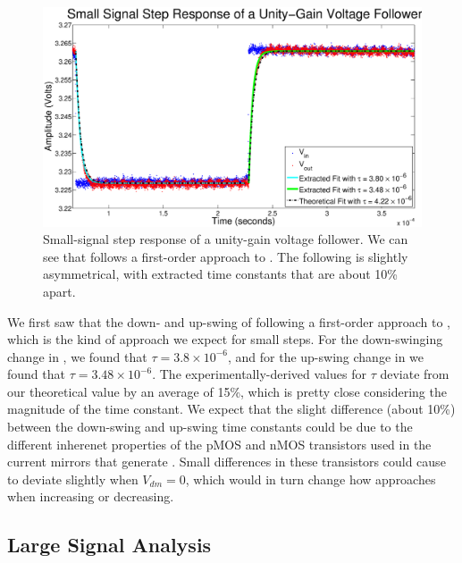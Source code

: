 \begin{figure}[H]
\centering
\includegraphics[width=\linewidth]{../Figures/Exp3P2.eps}
\caption{Small-signal step response of a unity-gain voltage follower. We can see that \Vout follows a first-order approach to \Vin. The following is slightly asymmetrical, with extracted time constants that are about 10\% apart.}
\label{fig:exp3p2}
\end{figure}

We first saw that the down- and up-swing of \Vout following a first-order approach to \Vin, which is the kind of approach we expect for small steps. For the down-swinging change in \Vout, we found that $\tau = 3.8 \times 10^{-6}$, and for the up-swing change in \Vout we found that $\tau = 3.48 \times 10^{-6}$. The experimentally-derived values for $\tau$ deviate from our theoretical value by an average of 15\%, which is pretty close considering the magnitude of the time constant. We expect that the slight difference (about 10\%) between the down-swing and up-swing time constants could be due to the different inherenet properties of the pMOS and nMOS transistors used in the current mirrors that generate \Vout. Small differences in these transistors could cause \Vout to deviate slightly when $V_{dm} = 0$, which would in turn change how \Vout approaches \Vin when increasing or decreasing.

\subsection*{Large Signal Analysis}


